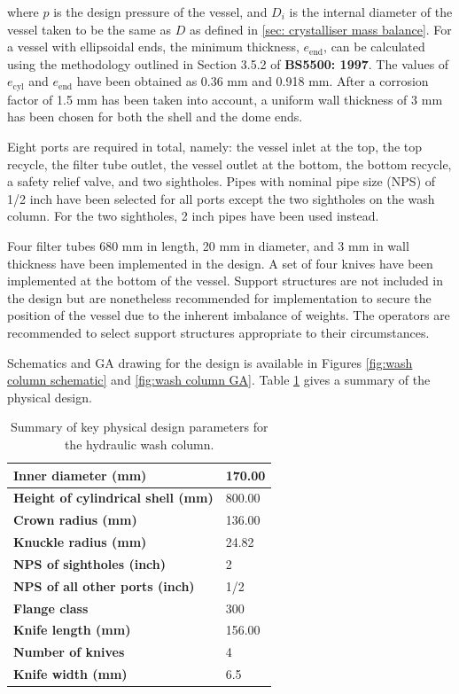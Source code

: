 \noindent where $p$ is the design pressure of the vessel, and $D_i$ is the internal diameter of the vessel taken to be the same as $D$ as defined in \cref{sec: crystalliser mass balance}. For a vessel with ellipsoidal ends, the minimum thickness, $e_{\mathrm{end}}$, can be calculated using the methodology outlined in Section 3.5.2 of \textbf{BS5500: 1997}. The values of $e_{\mathrm{cyl}}$ and $e_{\mathrm{end}}$ have been obtained as 0.36 mm and 0.918 mm. After a corrosion factor of 1.5 mm has been taken into account, a uniform wall thickness of 3 mm has been chosen for both the shell and the dome ends. 

Eight ports are required in total, namely: the vessel inlet at the top, the top recycle, the filter tube outlet, the vessel outlet at the bottom, the bottom recycle, a safety relief valve, and two sightholes. Pipes with nominal pipe size (NPS) of 1/2 inch have been selected for all ports except the two sightholes on the wash column. For the two sightholes, 2 inch pipes have been used instead. 

Four filter tubes 680 mm in length, 20 mm in diameter, and 3 mm in wall thickness have been implemented in the design. A set of four knives have been implemented at the bottom of the vessel. Support structures are not included in the design but are nonetheless recommended for implementation to secure the position of the vessel due to the inherent imbalance of weights. The operators are recommended to select support structures appropriate to their circumstances. 

Schematics and GA drawing for the design is available in Figures \ref{fig:wash column schematic} and \ref{fig:wash column GA}. Table \ref{tab:wash column mech design summary} gives a summary of the physical design. 

\begin{table}[h] \label{tab:wash column mech design summary}
\centering
\caption{Summary of key physical design parameters for the hydraulic wash column.}
\label{tab:wash column mech design summary}
\begin{tabular}{@{}l|l@{}}
\toprule
\textbf{Inner diameter (mm)}                &    170.00 \\ \midrule
\textbf{Height of cylindrical shell (mm)}   & 800.00 \\ \midrule
\textbf{Crown radius (mm)}                  & 136.00 \\ \midrule
\textbf{Knuckle radius (mm)}                & 24.82  \\ \midrule
\textbf{NPS of sightholes (inch)}                & 2 \\ \midrule
\textbf{NPS of all other ports (inch)}                & 1/2 \\ \midrule
\textbf{Flange class}                       & 300 \\ \midrule
\textbf{Knife length (mm)}              & 156.00 \\ \midrule
\textbf{Number of knives}            & 4 \\ \midrule
\textbf{Knife width (mm)}          & 6.5 \\ \bottomrule
\end{tabular}
\end{table}

